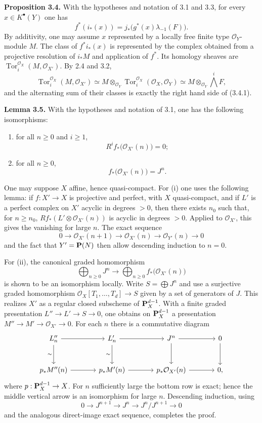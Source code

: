 \documentclass[11pt]{article}
\newcommand{\Tor}{\operatorname{Tor}}
\providecommand{\Tor}{\operatorname{Tor}}
\providecommand{\cO}{\mathcal O}
\begin{document}
\textbf{Proposition 3.4.} With the hypotheses and notation of 3.1 and 3.3, for every \(x\in K^\bullet(Y)\) one has
\begin{equation}\tag{3.4.1}
f^*(i_*(x))=j_*\bigl(g^*(x)\lambda_{-1}(F)\bigr).
\end{equation}
By additivity, one may assume \(x\) represented by a locally free finite type \(\cO_Y\)-module \(M\). The class of \(f^*i_*(x)\) is represented by the complex obtained from a projective resolution of \(i_*M\) and application of \(f^*\). Its homology sheaves are \(\Tor_i^{\cO_X}(M,\cO_{X'})\). By 2.4 and 3.2,
\[
\Tor_i^{\cO_X}(M,\cO_{X'})
\simeq M\otimes_{\cO_Y}\Tor_i^{\cO_X}(\cO_X,\cO_Y)
\simeq M\otimes_{\cO_Y}\bigwedge^iF,
\]
and the alternating sum of their classes is exactly the right hand side of (3.4.1).

\textbf{Lemma 3.5.} With the hypotheses and notation of 3.1, one has the following isomorphisms:
\begin{enumerate}[label=\roman*)]
\item for all \(n\ge0\) and \(i\ge1\),
\[
R^if_*\bigl(\cO_{X'}(n)\bigr)=0;
\]
\item for all \(n\ge0\),
\[
f_*\bigl(\cO_{X'}(n)\bigr)=J^n.
\]
\end{enumerate}
One may suppose \(X\) affine, hence quasi-compact. For (i) one uses the following lemma: if \(f:X'\to X\) is projective and perfect, with \(X\) quasi-compact, and if \(L'\) is a perfect complex on \(X'\) acyclic in degrees \(>0\), then there exists \(n_0\) such that, for \(n\ge n_0\), \(Rf_*(L'\otimes\cO_{X'}(n))\) is acyclic in degrees \(>0\). Applied to \(\cO_{X'}\), this gives the vanishing for large \(n\). The exact sequence
\[
0\to \cO_{X'}(n+1)\to\cO_{X'}(n)\to\cO_{Y'}(n)\to0
\]
and the fact that \(Y'=\mathbf P(N)\) then allow descending induction to \(n=0\).

For (ii), the canonical graded homomorphism
\[
\bigoplus_{n\ge0}J^n\longrightarrow\bigoplus_{n\ge0}f_*\bigl(\cO_{X'}(n)\bigr)
\]
is shown to be an isomorphism locally. Write \(S=\bigoplus J^n\) and use a surjective graded homomorphism \(\cO_X[T_1,\ldots,T_d]\to S\) given by a set of generators of \(J\). This realizes \(X'\) as a regular closed subscheme of \(\mathbf P_X^{d-1}\). With a finite graded presentation \(L''\to L'\to S\to0\), one obtains on \(\mathbf P_X^{d-1}\) a presentation \(M''\to M'\to\cO_{X'}\to0\). For each \(n\) there is a commutative diagram
\[
\begin{tikzcd}[column sep=large,row sep=large]
L''_n \arrow[r] \arrow[d,"\sim"'] & L'_n \arrow[r] \arrow[d,"\sim"'] & J^n \arrow[r] \arrow[d] & 0 \arrow[d]\\
p_*M''(n) \arrow[r] & p_*M'(n) \arrow[r] & p_*\cO_{X'}(n) \arrow[r] & 0,
\end{tikzcd}
\]
where \(p:\mathbf P_X^{d-1}\to X\). For \(n\) sufficiently large the bottom row is exact; hence the middle vertical arrow is an isomorphism for large \(n\). Descending induction, using
\[
0\to J^{n+1}\to J^n\to J^n/J^{n+1}\to0
\]
and the analogous direct-image exact sequence, completes the proof.
\end{document}
